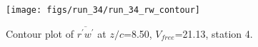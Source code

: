 \begin{figure}[H]
\centering
\texttt{[image: figs/run\_34/run\_34\_rw\_contour]}
\caption{Contour plot of $\overline{r^\prime w^\prime}$ at $z/c$=8.50, $V_{free}$=21.13, station 4.}
\label{fig:run_34_rw_contour}
\end{figure}


